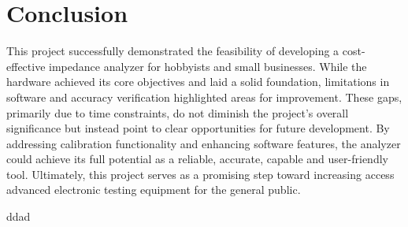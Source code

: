\chapter{Conclusion} \label{ch:Conclusion}
This project successfully demonstrated the feasibility of developing a cost-effective impedance analyzer for hobbyists and small businesses. While the hardware achieved its core objectives and laid a solid foundation, limitations in software and accuracy verification highlighted areas for improvement. These gaps, primarily due to time constraints, do not diminish the project's overall significance but instead point to clear opportunities for future development. By addressing calibration functionality and enhancing software features, the analyzer could achieve its full potential as a reliable, accurate, capable and user-friendly tool. Ultimately, this project serves as a promising step toward increasing access advanced electronic testing equipment for the general public.


ddad
